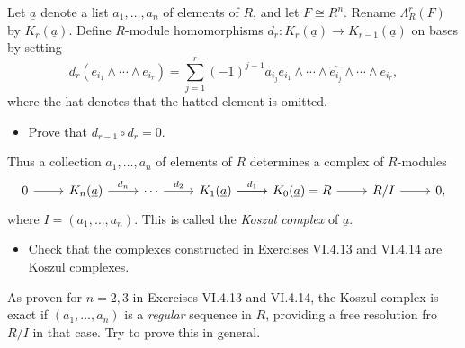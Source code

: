 \documentclass[../../master.tex]{subfiles}
\begin{document}
\begin{problem}
    Let $\underline{a}$ denote a list $a_1, \ldots, a_n$ of elements of $R$, and let $F \cong R^{n}$.
    Rename $\Lambda_R^{r}(F)$ by $K_r(\underline{a})$.
    Define $R$-module homomorphisms $d_r : K_r(\underline{a}) \to K_{r-1}(\underline{a})$ on bases by setting
    \[
    d_r(e_{i_1} \wedge \cdots \wedge e_{i_r}) = \sum_{j=1}^{r}(-1)^{j-1} a_{i_j} e_{i_1} \wedge \cdots \wedge \hat{e_{i_j}} \wedge \cdots \wedge e_{i_r},
    \]
    where the hat denotes that the hatted element is omitted.
    \begin{itemize}
        \item Prove that $d_{r-1} \circ d_r = 0$.
    \end{itemize}
    Thus a collection $a_1, \ldots, a_n$ of elements of $R$ determines a complex of $R$-modules
    \[
    \begin{tikzcd}
        0 & K_n(\underline{a}) & \cdots & K_1(\underline{a}) & K_0(\underline{a}) = R & R/I & 0,
        \arrow[from=1-1, to=1-2] 
        \arrow[from=1-2, to=1-3, "d_n"]
        \arrow[from=1-3, to=1-4, "d_2"]
        \arrow[from=1-4, to=1-5, "d_1"]
        \arrow[from=1-4, to=1-5]
        \arrow[from=1-5, to=1-6] 
        \arrow[from=1-6, to=1-7] 
    \end{tikzcd}
    \]
    where $I = (a_1, \ldots, a_n)$.
    This is called the \textit{Koszul complex} of $\underline{a}$.
    \begin{itemize}
        \item Check that the complexes constructed in Exercises VI.4.13 and VI.4.14 are Koszul complexes.
    \end{itemize}
    As proven for $n = 2, 3$ in Exercises VI.4.13 and VI.4.14, the Koszul complex is exact if $(a_1, \ldots, a_n)$ is a \textit{regular} sequence in $R$, providing a free resolution fro $R/I$ in that case.
    Try to prove this in general.
\end{problem}
\end{document}
